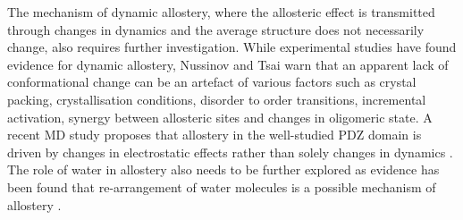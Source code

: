 The mechanism of dynamic allostery, where the allosteric effect is transmitted through changes in dynamics and the average structure does not necessarily change, also requires further investigation.
While experimental studies \cite{Popovych2006, Capdevila2017, Wellington2017} have found evidence for dynamic allostery, Nussinov and Tsai \cite{Nussinov2015} warn that an apparent lack of conformational change can be an artefact of various factors such as crystal packing, crystallisation conditions, disorder to order transitions, incremental activation, synergy between allosteric sites and changes in oligomeric state.
A recent MD study proposes that allostery in the well-studied PDZ domain is driven by changes in electrostatic effects rather than solely changes in dynamics \cite{Kumawat2017, Liu2017}.
The role of water in allostery also needs to be further explored as evidence has been found that re-arrangement of water molecules is a possible mechanism of allostery \cite{Buchli2013, Amor2016}.


